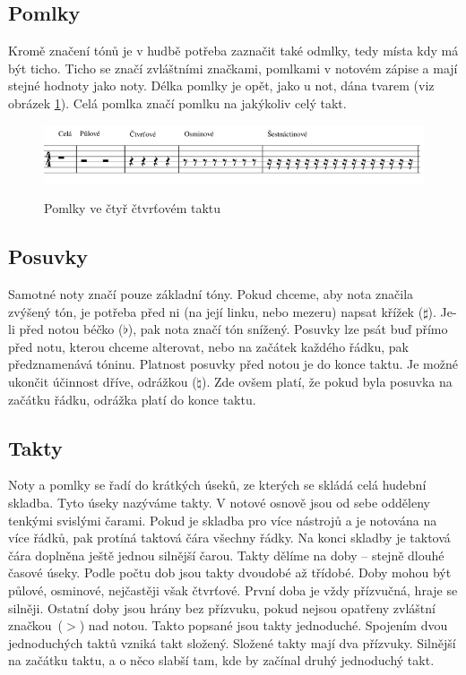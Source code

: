 \subsection{Pomlky}
Kromě značení tónů je v hudbě potřeba zaznačit také odmlky,
tedy místa kdy má být ticho.
Ticho se značí zvláštními značkami, pomlkami v notovém zápise 
a mají stejné hodnoty jako noty.
Délka pomlky je opět, jako u not, 
dána tvarem (viz obrázek \ref{obrazekPomlky}).
Celá pomlka značí pomlku na jakýkoliv celý takt.
\cite{cmiral,zenkl}

\begin{figure}[h]\centering
    \centering
    \includegraphics[width=0.8\linewidth]{obrazky/pomlky.png}\\[1pt]  
    \caption{Pomlky ve čtyř čtvrťovém taktu}    
    \label{obrazekPomlky}
\end{figure}

\subsection{Posuvky}
\label{kapitolaPosuvky}
Samotné noty značí pouze základní tóny.
Pokud chceme, aby nota značila zvýšený tón, 
je potřeba před ni (na její linku, nebo mezeru) napsat křížek ($\sharp $).
Je-li před notou béčko ($\flat $), pak nota značí tón snížený.
Posuvky lze psát buď přímo před notu, kterou chceme alterovat, 
nebo na začátek každého řádku, pak předznamenává tóninu.
Platnost posuvky před notou je do konce taktu.
Je možné ukončit účinnost dříve, odrážkou ($\natural $).
Zde ovšem platí, že pokud byla posuvka na začátku řádku, 
odrážka platí do konce taktu.
\cite{cmiral,zenkl}

\subsection{Takty}
Noty a pomlky se řadí do krátkých úseků, 
ze kterých se skládá celá hudební skladba.
Tyto úseky nazýváme takty.
V notové osnově jsou od sebe odděleny tenkými svislými čarami.
Pokud je skladba pro více nástrojů a je notována na více řádků, 
pak protíná taktová čára všechny řádky.
Na konci skladby je taktová čára doplněna ještě jednou silnější čarou. 
Takty dělíme na doby -- stejně dlouhé časové úseky.
Podle počtu dob jsou takty dvoudobé až třídobé.
Doby mohou být půlové, osminové, nejčastěji však čtvrťové.
První doba je vždy přízvučná, hraje se silněji.
Ostatní doby jsou hrány bez přízvuku, 
pokud nejsou opatřeny zvláštní značkou~($>$) nad notou.
Takto popsané jsou takty jednoduché.
Spojením dvou jednoduchých taktů vzniká takt složený.
Složené takty mají dva přízvuky.
Silnější na začátku taktu, a o něco slabší tam, 
kde by začínal druhý jednoduchý takt.
\par

